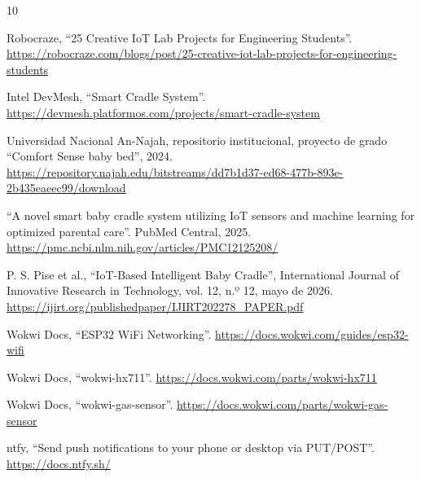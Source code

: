 \begin{thebibliography}{10}

 Robocraze, ``25 Creative IoT Lab Projects for Engineering
Students''. \url{https://robocraze.com/blogs/post/25-creative-iot-lab-projects-for-engineering-students}

 Intel DevMesh, ``Smart Cradle System''.
\url{https://devmesh.platformos.com/projects/smart-cradle-system}

 Universidad Nacional An-Najah, repositorio institucional, proyecto de
grado ``Comfort Sense baby bed'', 2024.
\url{https://repository.najah.edu/bitstreams/dd7b1d37-ed68-477b-893e-2b435eaeec99/download}

 ``A novel smart baby cradle system utilizing IoT sensors and machine
learning for optimized parental care''. PubMed Central, 2025.
\url{https://pmc.ncbi.nlm.nih.gov/articles/PMC12125208/}

 P. S. Pise et al., ``IoT-Based Intelligent Baby Cradle'', International
Journal of Innovative Research in Technology, vol. 12, n.º 12, mayo de 2026.
\url{https://ijirt.org/publishedpaper/IJIRT202278_PAPER.pdf}

 Wokwi Docs, ``ESP32 WiFi Networking''.
\url{https://docs.wokwi.com/guides/esp32-wifi}

 Wokwi Docs, ``wokwi-hx711''.
\url{https://docs.wokwi.com/parts/wokwi-hx711}

 Wokwi Docs, ``wokwi-gas-sensor''.
\url{https://docs.wokwi.com/parts/wokwi-gas-sensor}

 ntfy, ``Send push notifications to your phone or desktop via PUT/POST''.
\url{https://docs.ntfy.sh/}

\end{thebibliography}


